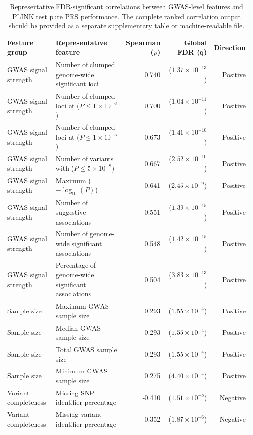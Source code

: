 \documentclass[11pt,a4paper]{article}
\begin{document}
\begin{table}[htbp]
\centering
\caption{Representative FDR-significant correlations between GWAS-level features and PLINK test pure PRS performance. The complete ranked correlation output should be provided as a separate supplementary table or machine-readable file.}
\label{tab}
\small
\begin{tabular}{p{} p{} r r r}
\toprule
\textbf{Feature group} & \textbf{Representative feature} & \textbf{Spearman ($\rho$)} & \textbf{Global FDR (q)} & \textbf{Direction} \\
\midrule
GWAS signal strength & Number of clumped genome-wide significant loci & 0.740 & ($1.37 \times 10^{-13}$) & Positive \\
GWAS signal strength & Number of clumped loci at ($P \leq 1 \times 10^{-6}$) & 0.700 & ($1.04 \times 10^{-11}$) & Positive \\
GWAS signal strength & Number of clumped loci at ($P \leq 1 \times 10^{-5}$) & 0.673 & ($1.41 \times 10^{-10}$) & Positive \\
GWAS signal strength & Number of variants with ($P \leq 5 \times 10^{-8}$) & 0.667 & ($2.52 \times 10^{-10}$) & Positive \\
GWAS signal strength & Maximum ($-\log_{10}(P)$) & 0.641 & ($2.45 \times 10^{-9}$) & Positive \\
GWAS signal strength & Number of suggestive associations & 0.551 & ($1.39 \times 10^{-15}$) & Positive \\
GWAS signal strength & Number of genome-wide significant associations & 0.548 & ($1.42 \times 10^{-15}$) & Positive \\
GWAS signal strength & Percentage of genome-wide significant associations & 0.504 & ($3.83 \times 10^{-13}$) & Positive \\
Sample size & Maximum GWAS sample size & 0.293 & ($1.55 \times 10^{-4}$) & Positive \\
Sample size & Median GWAS sample size & 0.293 & ($1.55 \times 10^{-4}$) & Positive \\
Sample size & Total GWAS sample size & 0.293 & ($1.55 \times 10^{-4}$) & Positive \\
Sample size & Minimum GWAS sample size & 0.275 & ($4.40 \times 10^{-4}$) & Positive \\
Variant completeness & Missing SNP identifier percentage & -0.410 & ($1.51 \times 10^{-8}$) & Negative \\
Variant completeness & Missing variant identifier percentage & -0.352 & ($1.87 \times 10^{-6}$) & Negative \\

\end{tabular}
\end{table}
\end{document}
